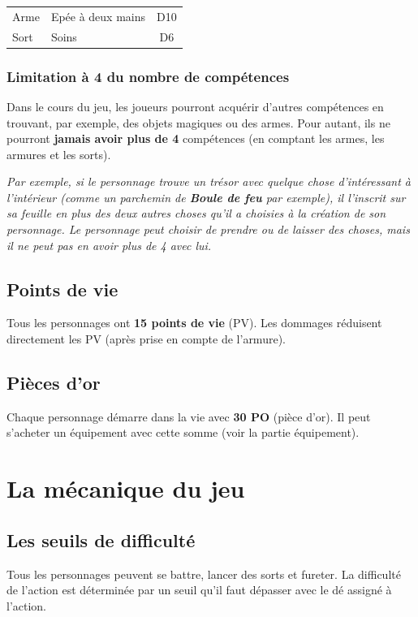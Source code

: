 \documentclass[a4paper, 11pt, twoside]{article}
\begin{document}
\begin{longtable}{llc}
Arme & Epée à deux mains & D10\\
Sort & Soins & D6\\
\end{longtable}

\subsubsection{Limitation à 4 du nombre de compétences}
\label{sec:org6e4ba7a}

Dans le cours du jeu, les joueurs pourront acquérir d'autres compétences en trouvant, par exemple, des objets magiques ou des armes. Pour autant, ils ne pourront \textbf{jamais avoir plus de 4} compétences (en comptant les armes, les armures et les sorts).

\emph{Par exemple, si le personnage trouve un trésor avec quelque chose d'intéressant à l'intérieur (comme un parchemin de \textbf{Boule de feu} par exemple), il l'inscrit sur sa feuille en plus des deux autres choses qu'il a choisies à la création de son personnage. Le personnage peut choisir de prendre ou de laisser des choses, mais il ne peut pas en avoir plus de 4 avec lui.}

\subsection{Points de vie}
\label{sec:org4dccc20}

Tous les personnages ont \textbf{15 points de vie} (PV). Les dommages réduisent directement les PV (après prise en compte de l'armure).

\subsection{Pièces d'or}
\label{sec:org0108e04}

Chaque personnage démarre dans la vie avec \textbf{30 PO} (pièce d'or). Il peut s'acheter un équipement avec cette somme (voir la partie équipement).

\section{La mécanique du jeu}
\label{sec:orgcfb3c80}
\subsection{Les seuils de difficulté}
\label{sec:orgced738c}
Tous les personnages peuvent se battre, lancer des sorts et fureter. La difficulté de l'action est déterminée par un seuil qu'il faut dépasser avec le dé assigné à l'action.
\end{document}
